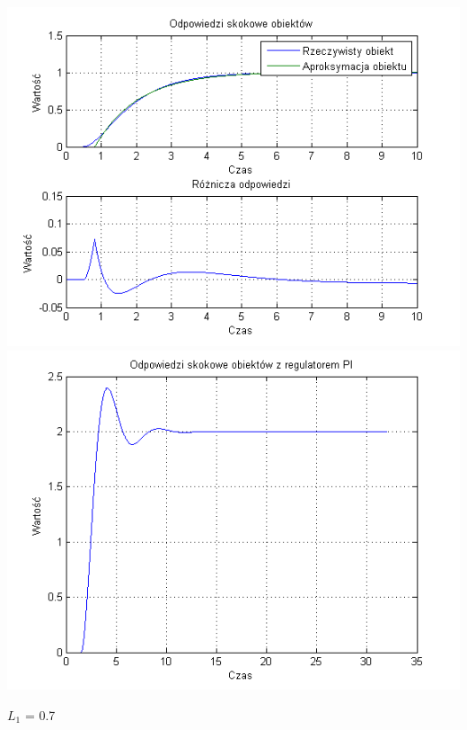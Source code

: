 \documentclass[10pt,a4paper]{article}
\begin{document}
\begin{center}
\includegraphics[scale=1]{images/jeden/skrypt_163.png}\\
\includegraphics[scale=1]{images/jeden/skrypt_164.png}\\
\end{center}
\newpage
$L_1$ = 0.7
\end{document}
